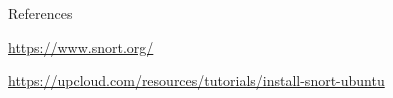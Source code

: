 \begin{frame}[t]{References}
  \fontsize{17}{20.5}\selectfont
  \vspace{0.4cm}
  {\color{ResearchColor}\url{https://www.snort.org/}\par}
  \vspace{0.35cm}
  {\color{ResearchColor}\url{https://upcloud.com/resources/tutorials/install-snort-ubuntu}\par}
\end{frame}
